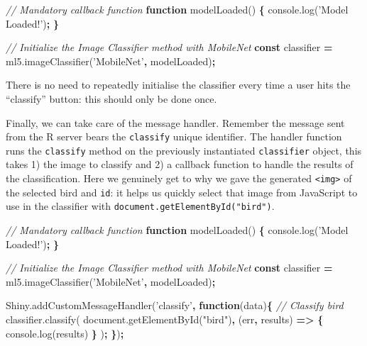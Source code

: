 \documentclass[10pt,]{krantz}
\makeatletter
\newenvironment{Shaded}{\begin{snugshade}}{\end{snugshade}}
\newcommand{\AttributeTok}[1]{\textcolor[rgb]{0.61,0.61,0.61}{#1}}
\newcommand{\CommentTok}[1]{\textcolor[rgb]{0.37,0.37,0.37}{\textit{#1}}}
\newcommand{\KeywordTok}[1]{\textcolor[rgb]{0.27,0.27,0.27}{\textbf{#1}}}
\newcommand{\NormalTok}[1]{#1}
\newcommand{\OperatorTok}[1]{\textcolor[rgb]{0.43,0.43,0.43}{\textbf{#1}}}
\newcommand{\StringTok}[1]{\textcolor[rgb]{0.5,0.5,0.5}{#1}}
\newcommand{\VariableTok}[1]{\textcolor[rgb]{0,0,0}{#1}}
\newenvironment{kframe}{%
\medskip{}
\setlength{\fboxsep}{.8em}
 \def\at@end@of@kframe{}%
 \ifinner\ifhmode%
  \def\at@end@of@kframe{\end{minipage}}%
  \begin{minipage}{\columnwidth}%
 \fi\fi%
 \def\FrameCommand##1{\hskip\@totalleftmargin \hskip-\fboxsep
 \colorbox{shadecolor}{##1}\hskip-\fboxsep
     \hskip-\linewidth \hskip-\@totalleftmargin \hskip\columnwidth}%
 \MakeFramed {\advance\hsize-\width
   \@totalleftmargin\z@ \linewidth\hsize
   \@setminipage}}%
 {\par\unskip\endMakeFramed%
 \at@end@of@kframe}
\renewenvironment{Shaded}{\begin{kframe}}{\end{kframe}}
\newenvironment{rmdblock}[1]
  {
  \begin{itemize}
  \renewcommand{\labelitemi}{
    \raisebox{-.7\height}[0pt][0pt]{
      {\setkeys{Gin}{width=3em,keepaspectratio}\texttt{[image: images/\#1]}}
    }
  }
  \setlength{\fboxsep}{1em}
  \begin{kframe}
  \item
  }
  {
  \end{kframe}
  \end{itemize}
  }
\newenvironment{rmdnote}
  {\begin{rmdblock}{note}}
  {\end{rmdblock}}
\makeatother
\begin{document}
\begin{Shaded}
\begin{Highlighting}[]
\CommentTok{// Mandatory callback function}
\KeywordTok{function} \AttributeTok{modelLoaded}\NormalTok{() }\OperatorTok{\{}
  \VariableTok{console}\NormalTok{.}\AttributeTok{log}\NormalTok{(}\StringTok{'Model Loaded!'}\NormalTok{)}\OperatorTok{;}
\OperatorTok{\}}

\CommentTok{// Initialize the Image Classifier method with MobileNet}
\KeywordTok{const}\NormalTok{ classifier }\OperatorTok{=} \VariableTok{ml5}\NormalTok{.}\AttributeTok{imageClassifier}\NormalTok{(}\StringTok{'MobileNet'}\OperatorTok{,}\NormalTok{ modelLoaded)}\OperatorTok{;}
\end{Highlighting}
\end{Shaded}

\begin{rmdnote}
There is no need to repeatedly initialise the classifier every time a
user hits the ``classify'' button: this should only be done once.
\end{rmdnote}

Finally, we can take care of the message handler. Remember the message sent from the R server bears the \texttt{classify} unique identifier. The handler function runs the \texttt{classify} method on the previously instantiated \texttt{classifier} object, this takes 1) the image to classify and 2) a callback function to handle the results of the classification. Here we genuinely get to why we gave the generated \texttt{\textless{}img\textgreater{}} of the selected bird and \texttt{id}: it helps us quickly select that image from JavaScript to use in the classifier with \texttt{document.getElementById("bird")}.

\begin{Shaded}
\begin{Highlighting}[]
\CommentTok{// Mandatory callback function}
\KeywordTok{function} \AttributeTok{modelLoaded}\NormalTok{() }\OperatorTok{\{}
  \VariableTok{console}\NormalTok{.}\AttributeTok{log}\NormalTok{(}\StringTok{'Model Loaded!'}\NormalTok{)}\OperatorTok{;}
\OperatorTok{\}}

\CommentTok{// Initialize the Image Classifier method with MobileNet}
\KeywordTok{const}\NormalTok{ classifier }\OperatorTok{=} \VariableTok{ml5}\NormalTok{.}\AttributeTok{imageClassifier}\NormalTok{(}\StringTok{'MobileNet'}\OperatorTok{,}\NormalTok{ modelLoaded)}\OperatorTok{;}

\VariableTok{Shiny}\NormalTok{.}\AttributeTok{addCustomMessageHandler}\NormalTok{(}\StringTok{'classify'}\OperatorTok{,} \KeywordTok{function}\NormalTok{(data)}\OperatorTok{\{}
  \CommentTok{// Classify bird}
  \VariableTok{classifier}\NormalTok{.}\AttributeTok{classify}\NormalTok{(}
    \VariableTok{document}\NormalTok{.}\AttributeTok{getElementById}\NormalTok{(}\StringTok{"bird"}\NormalTok{)}\OperatorTok{,}\NormalTok{ (err}\OperatorTok{,}\NormalTok{ results) }\KeywordTok{=>} \OperatorTok{\{}
      \VariableTok{console}\NormalTok{.}\AttributeTok{log}\NormalTok{(results)}
    \OperatorTok{\}}
\NormalTok{  )}\OperatorTok{;}
\OperatorTok{\}}\NormalTok{)}\OperatorTok{;}
\end{Highlighting}
\end{Shaded}
\end{document}
